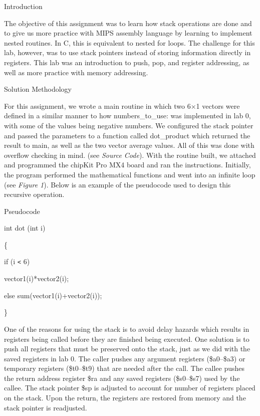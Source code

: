 \documentclass{article}
\begin{document}
\baselineskip=14pt
{\large{}{\color{color02} Introduction}}

The objective of this assignment was to learn how stack operations are done and
to give us more practice with MIPS assembly language by learning to implement nested
routines. In C, this is equivalent to nested for loops. The challenge for this
lab, however, was to use stack pointers instead of storing information directly
in registers. This lab was an introduction to push, pop, and register addressing,
as well as more practice with memory addressing.

{\large{}{\color{color02} Solution Methodology}}

For this assignment, we wrote a main routine in which two 6\ensuremath{\times}1
vectors were defined in a similar manner to how numbers\_to\_use: was implemented
in lab 0, with some of the values being negative numbers. We configured the stack
pointer and passed the parameters to a function called dot\_product which returned
the result to main, as well as the two vector average values. All of this was done
with overflow checking in mind. (see \emph{Source Code}). With the routine built,
we attached and programmed the chipKit Pro MX4 board and ran the instructions.
Initially, the program performed the mathematical functions and went into an infinite
loop (see \emph{Figure 1}). Below is an example of the pseudocode used to design
this recursive operation.

\begin{center}
\baselineskip=1pt
{\color{color04} Pseudocode}
\end{center}

\baselineskip=14pt
\leftskip=120pt
int dot (int i)

\{

\parindent=18pt
if (i \texttt{<} 6)

\parindent=36pt
vector1(i)*vector2(i);

\parindent=18pt
else sum(vector1(i)+vector2(i));

\parindent=0pt
\}

\vspace{14pt}
\leftskip=0pt
One of the reasons for using the stack is to avoid delay hazards which results
in registers being called before they are finished being executed. One solution
is to push all registers that must be preserved onto the stack, just as we did
with the saved registers in lab 0. The caller pushes any argument registers (\$a0--\$a3)
or temporary registers (\$t0--\$t9) that are needed after the call. The callee
pushes the return address register \$ra and any saved registers (\$s0--\$s7) used
by the callee. The stack pointer \$sp is adjusted to account for number of registers
placed on the stack. Upon the return, the registers are restored from memory and
the stack pointer is readjusted.
\end{document}
